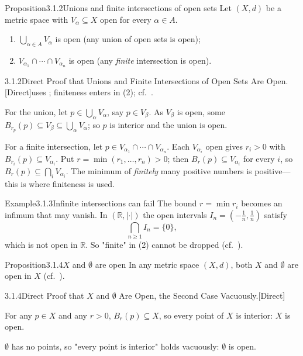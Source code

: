 \documentclass[main.tex]{subfiles}
\begin{document}
\begin{Obj}{Proposition}{3.1.2}{Unions and finite intersections of open sets}
Let $(X,d)$ be a metric space with $V_\alpha\subseteq X$ open for every $\alpha\in A$.
\begin{enumerate}
  \item $\bigcup_{\alpha\in A}V_\alpha$ is open (any union of open sets is open);
  \item $V_{\alpha_1}\cap\cdots\cap V_{\alpha_n}$ is open (any \emph{finite} intersection is open).
\end{enumerate}
\end{Obj}
\begin{Prf}{3.1.2}{Direct Proof that Unions and Finite Intersections of Open Sets Are Open.}{[Direct]\quad uses ; finiteness enters in (2); cf.\ .}
\item For the union, let $p\in\bigcup_\alpha V_\alpha$, say $p\in V_\beta$. As $V_\beta$ is open, some
  $B_{r_p}(p)\subseteq V_\beta\subseteq\bigcup_\alpha V_\alpha$; so $p$ is interior and the union is open.
\item For a finite intersection, let $p\in V_{\alpha_1}\cap\cdots\cap V_{\alpha_n}$. Each $V_{\alpha_i}$
  open gives $r_i>0$ with $B_{r_i}(p)\subseteq V_{\alpha_i}$. Put $r=\min(r_1,\dots,r_n)>0$; then
  $B_r(p)\subseteq V_{\alpha_i}$ for every $i$, so $B_r(p)\subseteq\bigcap_i V_{\alpha_i}$. The
  minimum of \emph{finitely} many positive numbers is positive---this is where finiteness is used.
\end{Prf}

\begin{ObjL}{Example}{3.1.3}{Infinite intersections can fail}
The bound $r=\min r_i$ becomes an infimum that may vanish. In $(\mathbb R,|\cdot|)$ the open
intervals $I_n=(-\tfrac1n,\tfrac1n)$ satisfy
\[ \bigcap_{n\ge1} I_n=\{0\}, \]
which is not open in $\mathbb R$. So "finite" in (2) cannot be dropped
(cf.\ ).
\end{ObjL}

\begin{Obj}{Proposition}{3.1.4}{$X$ and $\emptyset$ are open}
In any metric space $(X,d)$, both $X$ and $\emptyset$ are open in $X$ (cf.\ ).
\end{Obj}
\begin{Prf}{3.1.4}{Direct Proof that $X$ and $\emptyset$ Are Open, the Second Case Vacuously.}{[Direct]}
\item For any $p\in X$ and any $r>0$, $B_r(p)\subseteq X$, so every point of $X$ is interior: $X$ is open.
\item $\emptyset$ has no points, so "every point is interior" holds vacuously: $\emptyset$ is open.
\end{Prf}
\end{document}
